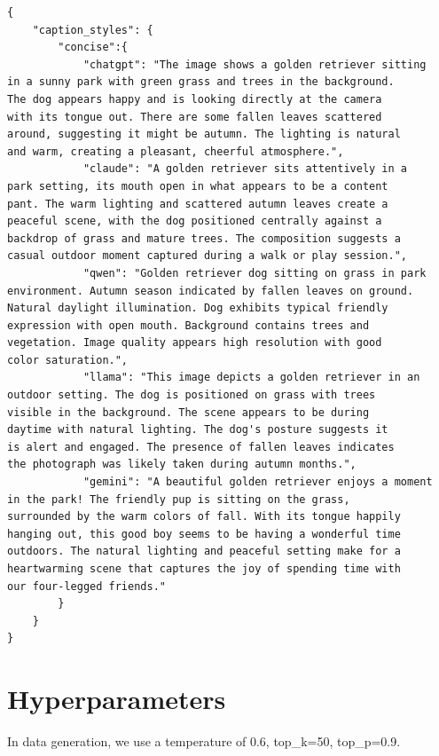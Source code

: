\begin{verbatim}
{
    "caption_styles": {
        "concise":{
            "chatgpt": "The image shows a golden retriever sitting 
in a sunny park with green grass and trees in the background. 
The dog appears happy and is looking directly at the camera 
with its tongue out. There are some fallen leaves scattered 
around, suggesting it might be autumn. The lighting is natural 
and warm, creating a pleasant, cheerful atmosphere.",
            "claude": "A golden retriever sits attentively in a 
park setting, its mouth open in what appears to be a content 
pant. The warm lighting and scattered autumn leaves create a 
peaceful scene, with the dog positioned centrally against a 
backdrop of grass and mature trees. The composition suggests a 
casual outdoor moment captured during a walk or play session.",
            "qwen": "Golden retriever dog sitting on grass in park 
environment. Autumn season indicated by fallen leaves on ground. 
Natural daylight illumination. Dog exhibits typical friendly 
expression with open mouth. Background contains trees and 
vegetation. Image quality appears high resolution with good 
color saturation.",
            "llama": "This image depicts a golden retriever in an 
outdoor setting. The dog is positioned on grass with trees 
visible in the background. The scene appears to be during 
daytime with natural lighting. The dog's posture suggests it 
is alert and engaged. The presence of fallen leaves indicates 
the photograph was likely taken during autumn months.",
            "gemini": "A beautiful golden retriever enjoys a moment 
in the park! The friendly pup is sitting on the grass, 
surrounded by the warm colors of fall. With its tongue happily 
hanging out, this good boy seems to be having a wonderful time 
outdoors. The natural lighting and peaceful setting make for a 
heartwarming scene that captures the joy of spending time with 
our four-legged friends."
        }
    }
}
\end{verbatim}


\section{Hyperparameters}
\label{app:hyperparameters}

In data generation, we use a temperature of 0.6, top\_k=50, top\_p=0.9.

